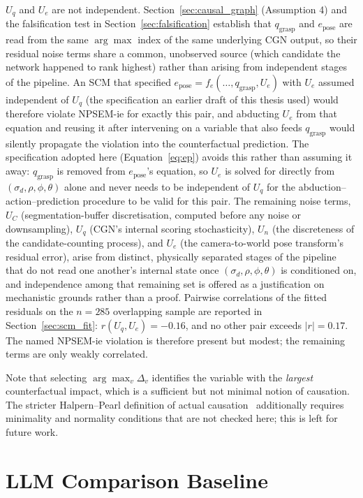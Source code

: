 \documentclass[11pt,a4paper]{report}
\begin{document}
$U_q$ and $U_e$ are not independent. Section~\ref{sec:causal_graph} (Assumption 4) and the falsification test in Section~\ref{sec:falsification} establish that $q_{\text{grasp}}$ and $e_{\text{pose}}$ are read from the same $\arg\max$ index of the same underlying CGN output, so their residual noise terms share a common, unobserved source (which candidate the network happened to rank highest) rather than arising from independent stages of the pipeline. An SCM that specified $e_{\text{pose}} = f_e(\ldots, q_{\text{grasp}}, U_e)$ with $U_e$ assumed independent of $U_q$ (the specification an earlier draft of this thesis used) would therefore violate NPSEM-ie for exactly this pair, and abducting $U_e$ from that equation and reusing it after intervening on a variable that also feeds $q_{\text{grasp}}$ would silently propagate the violation into the counterfactual prediction. The specification adopted here (Equation~\ref{eq:ep}) avoids this rather than assuming it away: $q_{\text{grasp}}$ is removed from $e_{\text{pose}}$'s equation, so $U_e$ is solved for directly from $(\sigma_d, \rho, \phi, \theta)$ alone and never needs to be independent of $U_q$ for the abduction--action--prediction procedure to be valid for this pair. The remaining noise terms, $U_C$ (segmentation-buffer discretisation, computed before any noise or downsampling), $U_q$ (CGN's internal scoring stochasticity), $U_n$ (the discreteness of the candidate-counting process), and $U_e$ (the camera-to-world pose transform's residual error), arise from distinct, physically separated stages of the pipeline that do not read one another's internal state once $(\sigma_d, \rho, \phi, \theta)$ is conditioned on, and independence among that remaining set is offered as a justification on mechanistic grounds rather than a proof. Pairwise correlations of the fitted residuals on the $n{=}285$ overlapping sample are reported in Section~\ref{sec:scm_fit}: $r(U_q,U_e) = -0.16$, and no other pair exceeds $|r|{=}0.17$. The named NPSEM-ie violation is therefore present but modest; the remaining terms are only weakly correlated.

Note that selecting $\arg\max_v \Delta_v$ identifies the variable with the \emph{largest} counterfactual impact, which is a sufficient but not minimal notion of causation. The stricter Halpern--Pearl definition of actual causation~\cite{halpern2005causes} additionally requires minimality and normality conditions that are not checked here; this is left for future work.

\section{LLM Comparison Baseline}
\label{sec:llm_baseline}
\end{document}
